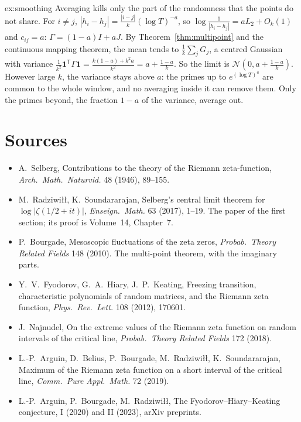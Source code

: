 \begin{solution}{ex:smoothing}
\idea Averaging kills only the part of the randomness that the points do not share.
\writeup For $i\ne j$, $|h_i-h_j|=\frac{|i-j|}k(\log T)^{-a}$, so $\log\frac1{|h_i-h_j|}=aL_2+O_k(1)$ and $c_{ij}=a$: $\Gamma=(1-a)I+aJ$. By Theorem~\ref{thm:multipoint} and the continuous mapping theorem, the mean tends to $\frac1k\sum_jG_j$, a centred Gaussian with variance $\frac1{k^2}\mathbf 1^{\mathsf T}\Gamma\mathbf 1=\frac{k(1-a)+k^2a}{k^2}=a+\frac{1-a}k$. So the limit is $\mathcal N(0,a+\frac{1-a}k)$. However large $k$, the variance stays above $a$: the primes up to $e^{(\log T)^a}$ are common to the whole window, and no averaging inside it can remove them. Only the primes beyond, the fraction $1-a$ of the variance, average out.
\end{solution}

\section{Sources}

\begin{itemize}
\item A.~Selberg, Contributions to the theory of the Riemann zeta-function, \emph{Arch.\ Math.\ Naturvid.} 48 (1946), 89--155.
\item M.~Radziwi\l\l, K.~Soundararajan, Selberg's central limit theorem for $\log|\zeta(1/2+it)|$, \emph{Enseign.\ Math.} 63 (2017), 1--19. The paper of the first section; its proof is Volume~14, Chapter~7.
\item P.~Bourgade, Mesoscopic fluctuations of the zeta zeros, \emph{Probab.\ Theory Related Fields} 148 (2010). The multi-point theorem, with the imaginary parts.
\item Y.~V.~Fyodorov, G.~A.~Hiary, J.~P.~Keating, Freezing transition, characteristic polynomials of random matrices, and the Riemann zeta function, \emph{Phys.\ Rev.\ Lett.} 108 (2012), 170601.
\item J.~Najnudel, On the extreme values of the Riemann zeta function on random intervals of the critical line, \emph{Probab.\ Theory Related Fields} 172 (2018).
\item L.-P.~Arguin, D.~Belius, P.~Bourgade, M.~Radziwi\l\l, K.~Soundararajan, Maximum of the Riemann zeta function on a short interval of the critical line, \emph{Comm.\ Pure Appl.\ Math.} 72 (2019).
\item L.-P.~Arguin, P.~Bourgade, M.~Radziwi\l\l, The Fyodorov--Hiary--Keating conjecture, I (2020) and II (2023), arXiv preprints.
\end{itemize}
